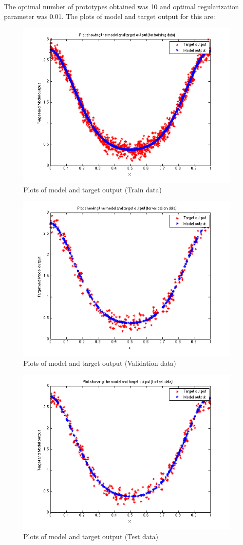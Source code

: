 \documentclass{article}
\begin{document}
The optimal number of prototypes obtained was 10 and optimal regularization parameter was 0.01. The plots of model and target output for this are:

\begin{figure}[H]
\centering
\includegraphics[width=0.5\linewidth]{Regression/rbfnn_univariate/output_train.png}
\caption{Plots of model and target output (Train data)}
\end{figure}

\begin{figure}[H]
\centering
\includegraphics[width=0.5\linewidth]{Regression/rbfnn_univariate/output_val.png}
\caption{Plots of model and target output (Validation data)}
\end{figure}

\begin{figure}[H]
\centering
\includegraphics[width=0.5\linewidth]{Regression/rbfnn_univariate/output_test.png}
\caption{Plots of model and target output (Test data)}
\end{figure}
\end{document}
